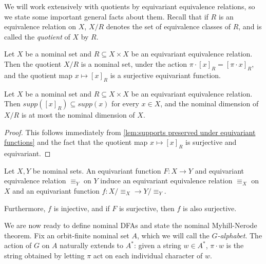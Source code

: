 \documentclass[runningheads]{llncs}
\newif\ifappendix
\begin{document}
We will work extensively with quotients by equivariant equivalence relations, so we state some important general facts about them.
Recall that if $R$ is an equivalence relation on $X$, $X/R$ denotes the set of equivalence classes of $R$, and is called the \emph{quotient} of $X$ by $R$.

\begin{lemma} \label{lem:quotient by equivariant equivalence relation is nominal}
    Let $X$ be a nominal set and $R \subseteq X \times X$ be an equivariant equivalence relation. 
    Then the quotient $X / R$ is a nominal set, under the action $\pi \cdot [x]_R = [\pi \cdot x]_R$, and the quotient map $x \mapsto [x]_R$ is a surjective equivariant function.
\end{lemma}

\begin{lemma} \label{lem:dimension of quotient at most dimension of original}
    Let $X$ be a nominal set and $R \subseteq X \times X$ be an equivariant equivalence relation.
    Then $supp([x]_R) \subseteq supp(x)$ for every $x \in X$, and the nominal dimension of $X/R$ is at most the nominal dimension of $X$.
\end{lemma}
\begin{proof}
    This follows immediately from \autoref{lem:supports preserved under equivariant functions} and the fact that the quotient map $x \mapsto [x]_R$ is surjective and equivariant.
\end{proof}


\begin{lemma} \label{lem:induced equivariant equivalence relations}
    Let $X, Y$ be nominal sets.
    An equivariant function $F : X \to Y$ and equivariant equivalence relation $\equiv_Y$ on $Y$ induce an equivariant equivalence relation $\equiv_X$ on $X$ and an equivariant function $f : X / \equiv_X \to Y / \equiv_Y$.

    Furthermore, $f$ is injective, and if $F$ is surjective, then $f$ is also surjective.
\end{lemma}


\ifappendix A proof of \autoref{lem:induced equivariant equivalence relations} is given in Appendix \ref{appendix:proof of induced equivariant equivalence relations}. \fi


We are now ready to define nominal DFAs and state the nominal Myhill-Nerode theorem.
Fix an orbit-finite nominal set $A$, which we will call the \textit{$G$-alphabet}. 
The action of $G$ on $A$ naturally extends to $A^*$: given a string $w \in A^*$, $\pi \cdot w$ is the string obtained by letting $\pi$ act on each individual character of $w$.  
\end{document}
